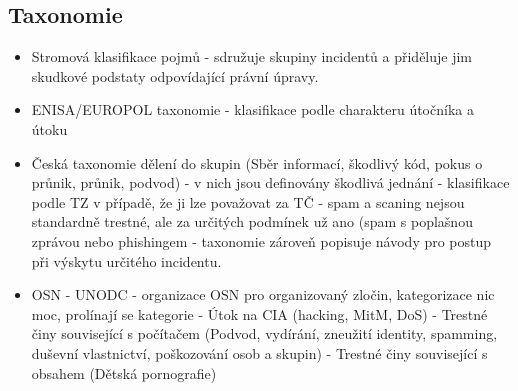 \subsection{Taxonomie}
\begin{itemize}
    \item Stromová klasifikace pojmů - sdružuje skupiny incidentů a přiděluje jim skudkové podstaty odpovídající právní úpravy.
    \item ENISA/EUROPOL taxonomie - klasifikace podle charakteru útočníka a útoku
    \item Česká taxonomie dělení do skupin (Sběr informací, škodlivý kód, pokus o průnik, průnik, podvod) - v nich jsou definovány škodlivá jednání - klasifikace podle TZ v případě, že ji lze považovat za TČ - spam a scaning nejsou standardně trestné, ale za určitých podmínek už ano (spam s poplašnou zprávou nebo phishingem - taxonomie zároveň popisuje návody pro postup při výskytu určitého incidentu.
    \item OSN - UNODC - organizace OSN pro organizovaný zločin, kategorizace nic moc, prolínají se kategorie - Útok na CIA (hacking, MitM, DoS) - Trestné činy související s počítačem (Podvod, vydírání, zneužití identity, spamming, duševní vlastnictví, poškozování osob a skupin) - Trestné činy související s obsahem (Dětská pornografie)
\end{itemize}

